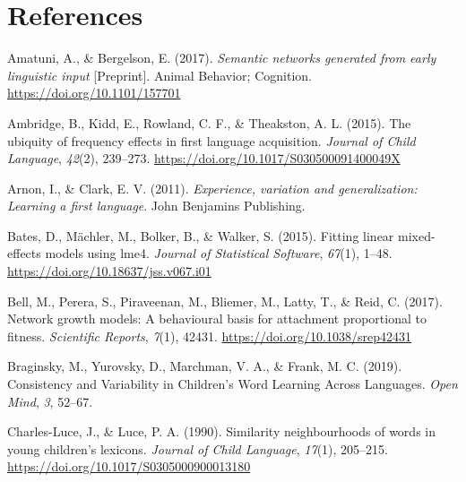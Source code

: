 \documentclass[
  man]{apa6}
\newlength{\cslhangindent}
\newlength{\cslentryspacingunit} %
\newenvironment{CSLReferences}[2] %
 {%
  \setlength{\parindent}{0pt}
  \ifodd #1
  \let\oldpar\par
  \def\par{\hangindent=\cslhangindent\oldpar}
  \fi
  \setlength{\parskip}{#2\cslentryspacingunit}
 }%
 {}
\begin{document}
\newpage

\hypertarget{references}{%
\section{References}\label{references}}

\begingroup
\setlength{\parindent}{-0.5in}
\setlength{\leftskip}{0.5in}

\hypertarget{refs}{}
\begin{CSLReferences}{1}{0}
\leavevmode{}%
Amatuni, A., \& Bergelson, E. (2017). \emph{Semantic networks generated from early linguistic input} {[}Preprint{]}. Animal Behavior; Cognition. \url{https://doi.org/10.1101/157701}

\leavevmode{}%
Ambridge, B., Kidd, E., Rowland, C. F., \& Theakston, A. L. (2015). The ubiquity of frequency effects in first language acquisition. \emph{Journal of Child Language}, \emph{42}(2), 239--273. \url{https://doi.org/10.1017/S030500091400049X}

\leavevmode{}%
Arnon, I., \& Clark, E. V. (2011). \emph{Experience, variation and generalization: Learning a first language}. John Benjamins Publishing.

\leavevmode{}%
Bates, D., Mächler, M., Bolker, B., \& Walker, S. (2015). Fitting linear mixed-effects models using {lme4}. \emph{Journal of Statistical Software}, \emph{67}(1), 1--48. \url{https://doi.org/10.18637/jss.v067.i01}

\leavevmode{}%
Bell, M., Perera, S., Piraveenan, M., Bliemer, M., Latty, T., \& Reid, C. (2017). Network growth models: A behavioural basis for attachment proportional to fitness. \emph{Scientific Reports}, \emph{7}(1), 42431. \url{https://doi.org/10.1038/srep42431}

\leavevmode{}%
Braginsky, M., Yurovsky, D., Marchman, V. A., \& Frank, M. C. (2019). Consistency and {Variability} in {Children}'s {Word} {Learning} {Across} {Languages}. \emph{Open Mind}, \emph{3}, 52--67.

\leavevmode{}%
Charles-Luce, J., \& Luce, P. A. (1990). Similarity neighbourhoods of words in young children's lexicons. \emph{Journal of Child Language}, \emph{17}(1), 205--215. \url{https://doi.org/10.1017/S0305000900013180}


\end{CSLReferences}
\end{document}
